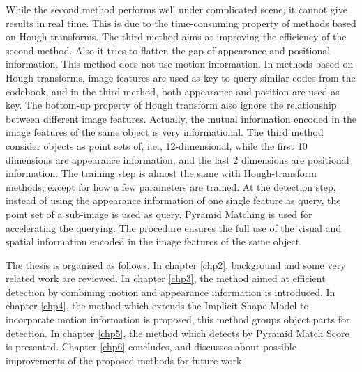 While the second method performs well under complicated scene, it cannot give results in real time. This is due to the time-consuming property of methods based on Hough transforms.   The third method aims at improving the efficiency of the second method. Also it tries to flatten the gap of appearance and positional information. This method does not use motion information. In methods based on Hough transforms, image features are used as key to query similar codes from the codebook, and in the third method, both appearance and position are used as key. The bottom-up property of Hough transform also ignore the relationship between different image features. Actually, the mutual information encoded in the image features of the same object is very informational. The third method consider objects as point sets of, i.e., 12-dimensional, while the first 10 dimensions are appearance information, and the last 2 dimensions are positional information. The training step is almost the same with Hough-transform methods, except for how a few parameters are trained. At the detection step, instead of using the appearance information of one single feature as query, the point set of a sub-image is used as query. Pyramid Matching is used for accelerating the querying. The procedure ensures the full use of the visual and spatial  information encoded in the image features of the same object.

The thesis is organised as follows. In chapter \ref{chp2}, background and some very related work are reviewed. In chapter \ref{chp3}, the method aimed at efficient detection by combining motion and appearance information is introduced. In chapter \ref{chp4}, the method which extends the Implicit Shape Model to incorporate motion information is proposed, this method groups object parts for detection. In chapter \ref{chp5}, the method which detects by Pyramid Match Score is presented. Chapter \ref{chp6} concludes, and discusses about possible improvements of the proposed methods for future work.



